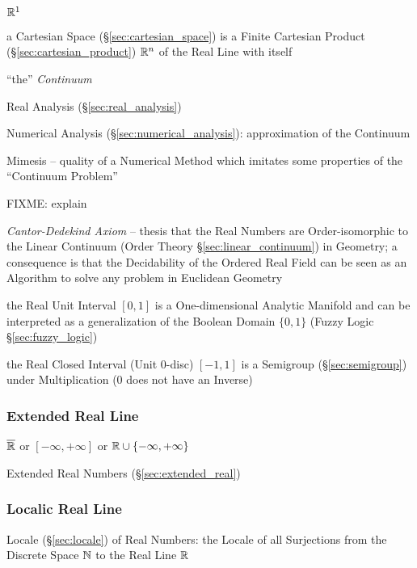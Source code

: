 $\mathbb{R}^1$

a Cartesian Space (\S\ref{sec:cartesian_space}) is a Finite Cartesian Product
(\S\ref{sec:cartesian_product}) $\mathbb{R}^n$ of the Real Line with itself

``the'' \emph{Continuum}

\fist Real Analysis (\S\ref{sec:real_analysis})

\fist Numerical Analysis (\S\ref{sec:numerical_analysis}): approximation of the
Continuum

Mimesis -- quality of a Numerical Method which imitates some properties of the
``Continuum Problem''

FIXME: explain

\emph{Cantor-Dedekind Axiom} -- thesis that the Real Numbers are
Order-isomorphic to the Linear Continuum (Order Theory
\S\ref{sec:linear_continuum}) in Geometry; a consequence is that the
Decidability of the Ordered Real Field can be seen as an Algorithm to solve any
problem in Euclidean Geometry

the Real Unit Interval $[0,1]$ is a One-dimensional Analytic Manifold and can be
interpreted as a generalization of the Boolean Domain $\{0, 1\}$ (Fuzzy Logic
\S\ref{sec:fuzzy_logic})

the Real Closed Interval (Unit 0-disc) $[-1,1]$ is a Semigroup
(\S\ref{sec:semigroup}) under Multiplication ($0$ does not have an Inverse)



\subsubsection{Extended Real Line}\label{sec:extended_real_line}

$\overline{\mathbb{R}}$ or $[-\infty, +\infty]$ or $\mathbb{R} \cup \{
-\infty, +\infty\}$

Extended Real Numbers (\S\ref{sec:extended_real})




\subsubsection{Localic Real Line}\label{sec:localic_real_line}

Locale (\S\ref{sec:locale}) of Real Numbers: the Locale of all Surjections from
the Discrete Space $\mathbb{N}$ to the Real Line $\mathbb{R}$



